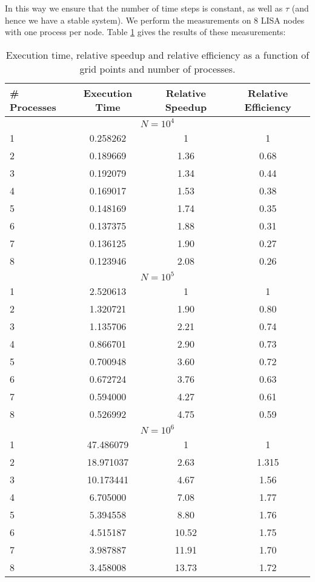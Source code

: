 \documentclass[11pt,a4paper,onecolumn]{article}
\begin{document}
In this way we ensure that the number of time steps is constant, as well as $\tau$ (and hence we have a stable system). We perform the measurements on 8 LISA nodes with one process per node. Table \ref{tab:wave} gives the results of these measurements:

\begin{table}[H]
  \centering
  \begin{tabular}{l | c | c | c}
    \# Processes & Execution Time & Relative Speedup & Relative Efficiency \\
    \hline
    \multicolumn{4}{c}{$N = 10^4$} \\
    \hline
    1 & 0.258262 & 1 & 1 \\ 
    2 & 0.189669 & 1.36 & 0.68 \\
    3 & 0.192079 & 1.34 & 0.44 \\
    4 & 0.169017 & 1.53 & 0.38 \\
    5 & 0.148169 & 1.74 & 0.35 \\
    6 & 0.137375 & 1.88 & 0.31 \\
    7 & 0.136125 & 1.90 & 0.27 \\
    8 & 0.123946 & 2.08 & 0.26 \\
    \hline
    \multicolumn{4}{c}{$N = 10^5$} \\
    \hline
    1 & 2.520613 & 1 & 1 \\
    2 & 1.320721 & 1.90 & 0.80 \\
    3 & 1.135706 & 2.21 & 0.74 \\
    4 & 0.866701 & 2.90 & 0.73 \\
    5 & 0.700948 & 3.60 & 0.72 \\
    6 & 0.672724 & 3.76 & 0.63 \\
    7 & 0.594000 & 4.27 & 0.61 \\ 
    8 & 0.526992 & 4.75 & 0.59 \\
    \hline
    \multicolumn{4}{c}{$N = 10^6$} \\
    \hline
    1 & 47.486079 & 1 & 1 \\ 
    2 & 18.971037 & 2.63 & 1.315 \\ 
    3 & 10.173441 & 4.67 & 1.56 \\
    4 & 6.705000 & 7.08 & 1.77 \\
    5 & 5.394558 & 8.80 & 1.76 \\
    6 & 4.515187 & 10.52 & 1.75 \\
    7 & 3.987887 & 11.91 & 1.70 \\
    8 & 3.458008 & 13.73 & 1.72 \\
  \end{tabular}
  \caption{Execution time, relative speedup and relative efficiency as a function of grid points and number of processes.}
  \label{tab:wave}
\end{table}
\end{document}
